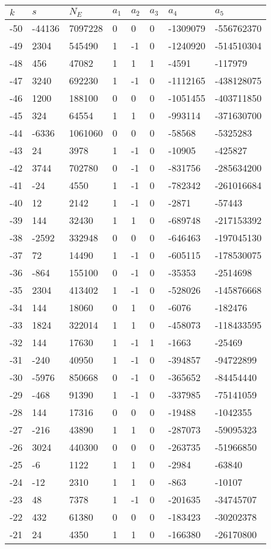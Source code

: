 \documentclass{amsart}
\begin{document}
\begin{longtable}{|l|l|l|lllll|}
\hline
$k$ & $s$ & $N_E$ & $a_1$ & $a_2$ & $a_3$ & $a_4$ & $a_5$\\
\hline
-50&-44136&7097228&0&0&0&-1309079&-556762370\\
-49&2304&545490&1&-1&0&-1240920&-514510304\\
-48&456&47082&1&1&1&-4591&-117979\\
-47&3240&692230&1&-1&0&-1112165&-438128075\\
-46&1200&188100&0&0&0&-1051455&-403711850\\
-45&324&64554&1&1&0&-993114&-371630700\\
-44&-6336&1061060&0&0&0&-58568&-5325283\\
-43&24&3978&1&-1&0&-10905&-425827\\
-42&3744&702780&0&-1&0&-831756&-285634200\\
-41&-24&4550&1&-1&0&-782342&-261016684\\
-40&12&2142&1&-1&0&-2871&-57443\\
-39&144&32430&1&1&0&-689748&-217153392\\
-38&-2592&332948&0&0&0&-646463&-197045130\\
-37&72&14490&1&-1&0&-605115&-178530075\\
-36&-864&155100&0&-1&0&-35353&-2514698\\
-35&2304&413402&1&-1&0&-528026&-145876668\\
-34&144&18060&0&1&0&-6076&-182476\\
-33&1824&322014&1&1&0&-458073&-118433595\\
-32&144&17630&1&-1&1&-1663&-25469\\
-31&-240&40950&1&-1&0&-394857&-94722899\\
-30&-5976&850668&0&-1&0&-365652&-84454440\\
-29&-468&91390&1&-1&0&-337985&-75141059\\
-28&144&17316&0&0&0&-19488&-1042355\\
-27&-216&43890&1&1&0&-287073&-59095323\\
-26&3024&440300&0&0&0&-263735&-51966850\\
-25&-6&1122&1&1&0&-2984&-63840\\
-24&-12&2310&1&1&0&-863&-10107\\
-23&48&7378&1&-1&0&-201635&-34745707\\
-22&432&61380&0&0&0&-183423&-30202378\\
-21&24&4350&1&1&0&-166380&-26170800\\

\end{longtable}
\end{document}
